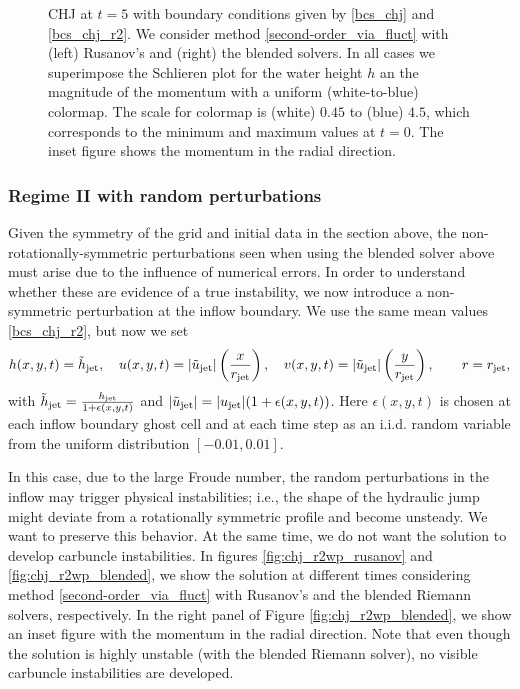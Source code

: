 \documentclass[preprint, 11pt]{article}
\newcommand{\jet}{{\textup{jet}}}
\newcommand{\bfu}{{u}}
\begin{document}
\begin{figure}[!h]
  \caption{CHJ at $t=5$ with boundary conditions given by \eqref{bcs_chj} and \eqref{bcs_chj_r2}. 
    We consider method \eqref{second-order_via_fluct} with (left) Rusanov's
    and (right) the blended solvers. 
    In all cases we superimpose the Schlieren plot for the water height $h$
    an the magnitude of the momentum with a uniform (white-to-blue) colormap. 
    The scale for colormap is (white) $0.45$ to (blue) $4.5$, 
    which corresponds to the minimum and maximum values at $t=0$.
    The inset figure shows the momentum in the radial direction.
    \label{fig:chj_r2_later}}
\end{figure}

\subsubsection{Regime II with random perturbations}\label{sec:regime_iiwp}
Given the symmetry of the grid and initial data in the section above,
the non-rotationally-symmetric perturbations seen when using the blended
solver above must arise due to the influence of numerical errors.
In order to understand whether these are evidence of a true instability,
we now introduce a non-symmetric perturbation at the inflow boundary.
We use the same mean values \eqref{bcs_chj_r2}, but now we set
\begin{subequations}
  \begin{align}
    h(x,y,t)=\tilde h_\jet, \quad
    u(x,y,t)=|\tilde \bfu_\jet| \left(\frac{x}{r_\jet}\right), \quad
    v(x,y,t)=|\tilde \bfu_\jet| \left(\frac{y}{r_\jet}\right), \qquad r=r_\jet,
  \end{align}
\end{subequations}
with $\tilde h_\jet = \frac{h_\jet}{1+\epsilon(x,y,t)}$ and $|\tilde\bfu_\jet|=|\bfu_\jet|(1+\epsilon(x,y,t))$.
Here $\epsilon(x,y,t)$ is chosen at each inflow boundary ghost cell and at each
time step as an i.i.d. random variable from the uniform distribution $[-0.01,0.01]$.



In this case, due to the large Froude number, the random perturbations in the inflow
may trigger physical instabilities;
{\color{OliveGreen} i.e., the shape of the hydraulic jump might deviate from a rotationally symmetric profile and become unsteady}.
We want to preserve this behavior. At the same time, we
do not want the solution to develop carbuncle instabilities.
In figures \ref{fig:chj_r2wp_rusanov} and \ref{fig:chj_r2wp_blended}, we show the solution
at different times considering method \eqref{second-order_via_fluct} with Rusanov's and
the blended Riemann solvers, respectively.
In the right panel of Figure \ref{fig:chj_r2wp_blended}, we show an inset figure 
with the momentum in the radial direction. Note that even though the solution is highly unstable 
(with the blended Riemann solver), no visible carbuncle instabilities are developed. 
\end{document}
